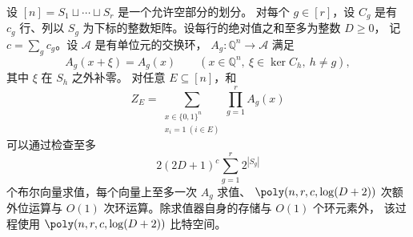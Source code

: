 \begin{lemma}\label{lem:measurement-separation}
设 $[n]=S_1\sqcup\cdots\sqcup S_r$ 是一个允许空部分的划分。
对每个 $g\in[r]$，设 $C_g$ 是有 $c_g$ 行、列以 $S_g$
为下标的整数矩阵。设每行的绝对值之和至多为整数 $D\ge0$，
记 $c=\sum_g c_g$。设 $\mathcal A$ 是有单位元的交换环，
$A_g:\mathbb Q^n\to\mathcal A$ 满足
\[
 A_g(x+\xi)=A_g(x)
 \qquad
 (x\in\mathbb Q^n,\ \xi\in\ker C_h,\ h\ne g),
\]
其中 $\xi$ 在 $S_h$ 之外补零。
对任意 $E\subseteq[n]$，和
\[
 Z_E=\sum_{\substack{x\in\{0,1\}^n\\x_i=1\ (i\in E)}}
           \prod_{g=1}^r A_g(x)
\]
可以通过检查至多
\[
 2(2D+1)^c\sum_{g=1}^r2^{|S_g|}
\]
个布尔向量求值，每个向量上至多一次 $A_g$ 求值、
$\poly(n,r,c,\log(D+2))$ 次额外位运算与 $O(1)$
次环运算。除求值器自身的存储与 $O(1)$ 个环元素外，
该过程使用 $\poly(n,r,c,\log(D+2))$ 比特空间。
\end{lemma}

